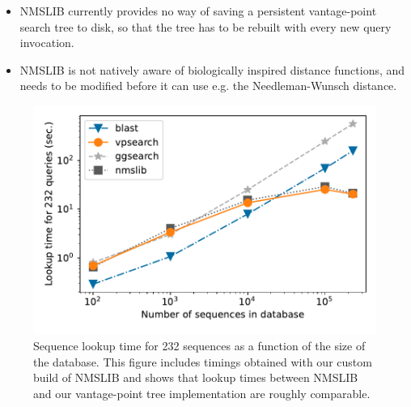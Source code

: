 \documentclass[11pt, a4paper]{article}
\begin{document}
\begin{itemize}
\item NMSLIB currently provides no way of saving a persistent vantage-point
  search tree to disk, so that the tree has to be rebuilt with every new query
  invocation.
\item NMSLIB is not natively aware of biologically inspired distance functions,
  and needs to be modified before it can use e.g. the Needleman-Wunsch
  distance.
\end{itemize}

\begin{figure} \label{fig:timing}
  \centering
  \includegraphics[scale=0.5]{execution-time-nmslib.pdf}
  \caption{Sequence lookup time for 232 sequences as a function of the size of
    the database. This figure includes timings obtained with our custom build
    of NMSLIB and shows that lookup times between NMSLIB and our vantage-point
    tree implementation are roughly comparable.}
\end{figure}



\end{document}
